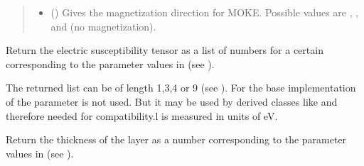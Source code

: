 \documentclass[letterpaper,10pt,english]{sphinxmanual}
\begin{document}
\begin{fulllineitems}
\begin{fulllineitems}
\begin{quote}
\begin{description}
\begin{itemize}
\item {} 
 () \textendash{} Gives the magnetization direction for MOKE. Possible values are , ,  and  (no magnetization).

\end{itemize}

\end{description}\end{quote}

\end{fulllineitems}


\begin{fulllineitems}
\label{\detokenize{modules-api/samplerepresentation:SampleRepresentation.LayerObject.getChi}}
Return the electric susceptibility tensor as a list of numbers for a certain  corresponding to the parameter values in  (see {\hyperref[\detokenize{modules-api/parameters:module-Parameters}]{}}).

The returned list can be of length 1,3,4 or 9 (see {\hyperref[\detokenize{modules-api/samplerepresentation:SampleRepresentation.LayerObject.__init__}]{}}).
For the base implementation of {\hyperref[\detokenize{modules-api/samplerepresentation:SampleRepresentation.LayerObject}]{}} the parameter  is not used. But it may be used by derived classes like {\hyperref[\detokenize{modules-api/samplerepresentation:SampleRepresentation.AtomLayerObject}]{}} and therefore needed for compatibility.l
 is measured in units of eV.

\end{fulllineitems}


\begin{fulllineitems}
\label{\detokenize{modules-api/samplerepresentation:SampleRepresentation.LayerObject.getD}}
Return the thickness of the layer as a number corresponding to the parameter values in  (see {\hyperref[\detokenize{modules-api/parameters:module-Parameters}]{}}).


\end{fulllineitems}
\end{fulllineitems}
\end{document}
